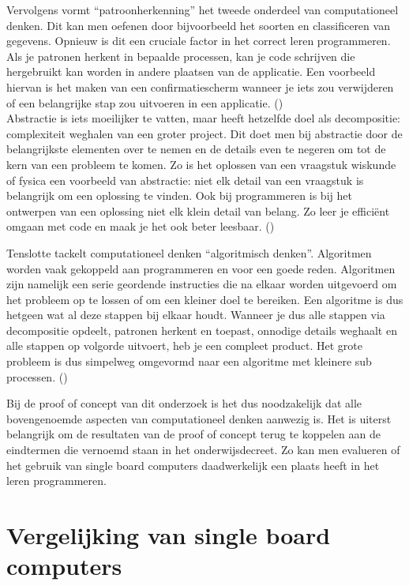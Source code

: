 Vervolgens vormt “patroonherkenning” het tweede onderdeel van computationeel denken. Dit kan men oefenen door bijvoorbeeld het soorten en classificeren van gegevens. Opnieuw is dit een cruciale factor in het correct leren programmeren. Als je patronen herkent in bepaalde processen, kan je code schrijven die hergebruikt kan worden in andere plaatsen van de applicatie. Een voorbeeld hiervan is het maken van een confirmatiescherm wanneer je iets zou verwijderen of een belangrijke stap zou uitvoeren in een applicatie.
(\cite{Smartschool})\\

Abstractie is iets moeilijker te vatten, maar heeft hetzelfde doel als decompositie: complexiteit weghalen van een groter project. Dit doet men bij abstractie door de belangrijkste elementen over te nemen en de details even te negeren om tot de kern van een probleem te komen. Zo is het oplossen van een vraagstuk wiskunde of fysica een voorbeeld van abstractie: niet elk detail van een vraagstuk is belangrijk om een oplossing te vinden. Ook bij programmeren is bij het ontwerpen van een oplossing niet elk klein detail van belang. Zo leer je efficiënt omgaan met code en maak je het ook beter leesbaar.
(\cite{Smartschool})

Tenslotte tackelt computationeel denken “algoritmisch denken”. Algoritmen worden vaak gekoppeld aan programmeren en voor een goede reden. Algoritmen zijn namelijk een serie geordende instructies die na elkaar worden uitgevoerd om het probleem op te lossen of om een kleiner doel te bereiken. Een algoritme is dus hetgeen wat al deze stappen bij elkaar houdt. Wanneer je dus alle stappen via decompositie opdeelt, patronen herkent en toepast, onnodige details weghaalt en alle stappen op volgorde uitvoert, heb je een compleet product. Het grote probleem is dus simpelweg omgevormd naar een algoritme met kleinere sub processen. 
(\cite{Smartschool})


Bij de proof of concept van dit onderzoek is het dus noodzakelijk dat alle bovengenoemde aspecten van computationeel denken aanwezig is. Het is uiterst belangrijk om de resultaten van de proof of concept terug te koppelen aan de eindtermen die vernoemd staan in het onderwijsdecreet. Zo kan men evalueren of het gebruik van single board computers daadwerkelijk een plaats heeft in het leren programmeren.


\section{Vergelijking van single board computers}

